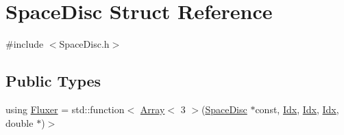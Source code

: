 \hypertarget{structSpaceDisc}{}\section{Space\+Disc Struct Reference}
\label{structSpaceDisc}


{\ttfamily \#include $<$Space\+Disc.\+h$>$}

\subsection*{Public Types}
\begin{DoxyCompactItemize}
\item 
using \hyperlink{structSpaceDisc_a96fbebf5dd4659e2dcc144a5debc861d}{Fluxer} = std\+::function$<$ \hyperlink{Includes_8h_abd9de33944f934950000c3929e14ad8d}{Array}$<$ 3 $>$(\hyperlink{structSpaceDisc}{Space\+Disc} $\ast$const, \hyperlink{Includes_8h_ae78891cd308078a2f5f9e7193065c805}{Idx}, \hyperlink{Includes_8h_ae78891cd308078a2f5f9e7193065c805}{Idx}, \hyperlink{Includes_8h_ae78891cd308078a2f5f9e7193065c805}{Idx}, double $\ast$)$>$
\end{DoxyCompactItemize}
